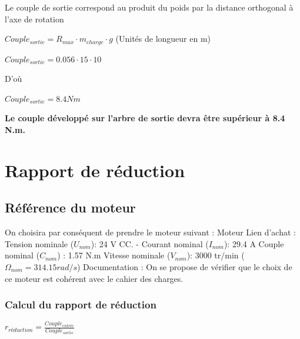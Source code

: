 Le couple de sortie correspond au produit du poids par la distance orthogonal à l'axe de rotation

$ Couple_{sortie} = R_{max} \cdot m_{charge} \cdot g$ \newline
(Unités de longueur en m) \newline

$ Couple_{sortie} =  0.056 \cdot 15 \cdot 10  $ \newline
 
D'où \newline

$ Couple_{sortie} =  8.4 Nm $\n

\textbf{Le couple développé sur l'arbre de sortie devra être supérieur à 8.4 N.m.}


\chapter{Rapport de réduction}

\section{Référence du moteur}
On choisira par conséquent de prendre le moteur suivant :
\n\n
Moteur  \newline
Lien d'achat : \href{https://www.technoindus.com/moteur-frein-a-courant-continu/moteur-a-courant-continu-ferrite-frein-350w-3000t-mn-24v-o11-bride-o90-ip40-3665948288223-4641.html}{} \newline
Tension nominale ($U_{nom}$): 24 V CC. - Courant nominal ($I_{nom}$): 29.4 A\newline
Couple nominal ($C_{nom}$) : 1.57 N.m \newline
Vitesse nominale ($V_{nom}$): 3000 tr/min ($\Omega_{nom} = 314.15 rad/s$) \newline
Documentation : \href{https://www.technoindus.com/index.php?controller=attachment&id_attachment=138}{} \n\n
On se propose de vérifier que le choix de ce moteur est cohérent avec le cahier des charges. 


\subsection{Calcul du rapport de réduction}


$ r_{réduction} = \frac{Couple_{entrée}}{Couple_{sortie}}$ \newline

